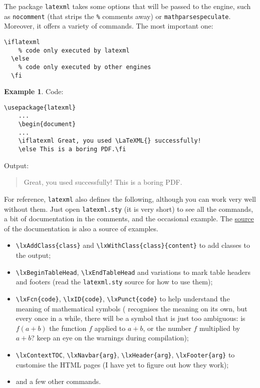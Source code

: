\documentclass[a4paper]{article}
\def\ltxinline{\lstinline[style=latexml]}
\theoremstyle{definition}
\newtheorem{exa}{Example}[subsection]
\begin{document}
The package \verb|latexml| takes some options that will be passed to the \LaTeXML{} engine, such as \ltxinline|nocomment| (that strips the \ltxinline|%
\begin{lstlisting}[style=latexml]
  \iflatexml
    % code only executed by latexml
  \else
    % code only executed by other engines
  \fi
\end{lstlisting}

\begin{exa}
  Code:
  \begin{lstlisting}[style=latexml]
    \usepackage{latexml}
    ...
    \begin{document}
    ...
    \iflatexml Great, you used \LaTeXML{} successfully!
    \else This is a boring PDF.\fi
  \end{lstlisting}
  Output:
  \begin{quote}
    \iflatexml Great, you used \LaTeXML{} successfully!
    \else This is a boring PDF.\fi
  \end{quote}
\end{exa}

For reference, \verb|latexml| also defines the following, although you can work very well without them. Just open \verb|latexml.sty| (it is very short) to see all the commands, a bit of documentation in the comments, and the occasional example. The \href{https://github.com/brucemiller/LaTeXML/tree/master/doc/manual}{source} of the \LaTeXML{} documentation is also a source of examples.
\begin{itemize}
  \item \ltxinline|\lxAddClass{class}| and \ltxinline|\lxWithClass{class}{content}| to add \CSS{} classes to the output;
  \item \ltxinline|\lxBeginTableHead|, \ltxinline|\lxEndTableHead| and variations to mark table headers and footers (read the \verb|latexml.sty| source for how to use them);
  \item \ltxinline|\lxFcn{code}|, \ltxinline|\lxID{code}|, \ltxinline|\lxPunct{code}| to help \LaTeXML{} understand the meaning of mathematical symbols (\LaTeXML{} recognises the meaning on its own, but every once in a while, there will be a symbol that is just too ambiguous: is $f(a+b)$ the function $f$ applied to $a+b$, or the number $f$ multiplied by $a+b$? keep an eye on the warnings during compilation);
  \item \ltxinline|\lxContextTOC|, \ltxinline|\lxNavbar{arg}|, \ltxinline|\lxHeader{arg}|, \ltxinline|\lxFooter{arg}| to customise the HTML pages (I have yet to figure out how they work);
  \item and a few other commands.
\end{itemize}
\end{document}
